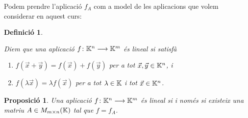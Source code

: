 \documentclass[
  11pt,
]{book}
\numberwithin{dummy}{section}
\theoremstyle{maincolornumbox}
\theoremstyle{blacknumex}
\theoremstyle{blacknumbox}
\newtheorem{definitionT}{Definició}[chapter]
\theoremstyle{maincolornum}
\newtheorem{propositionT}{Proposició}[chapter]
\newenvironment{proposition}{\begin{pBox}\begin{propositionT}}{\end{propositionT}\end{pBox}}
\newenvironment{definition}{\begin{dBox}\begin{definitionT}}{\end{definitionT}\end{dBox}}
\begin{document}
Podem prendre l'aplicació \(f_A\) com a model de les aplicacions que volem
considerar en aquest curs:

\begin{definition}
\protect\hypertarget{def:aplicaciolinealKn}{}\label{def:aplicaciolinealKn}

Diem que una
aplicació \(f\colon \mathbb{K}^n\longrightarrow \mathbb{K}^m\) \emph{és lineal} si satisfà

\begin{enumerate}
\def\labelenumi{\arabic{enumi}.}
\item
  \(f(\vec x+\vec y) = f(\vec x) + f(\vec y)\) per a tot
  \(\vec x, \vec y \in \mathbb{K}^n\), i
\item
  \(f(\lambda \vec x) = \lambda f(\vec x)\) per a tot \(\lambda\in\mathbb{K}\) i
  tot \(\vec x\in \mathbb{K}^n\).
\end{enumerate}

\end{definition}

\begin{proposition}
\protect\hypertarget{prp:apl-lin-Kn}{}\label{prp:apl-lin-Kn}Una aplicació
\(f\colon \mathbb{K}^n\longrightarrow \mathbb{K}^m\) és lineal si i només si existeix una matriu
\(A\in M_{m\times n}(\mathbb{K})\) tal que \(f=f_A\).
\end{proposition}
\end{document}
